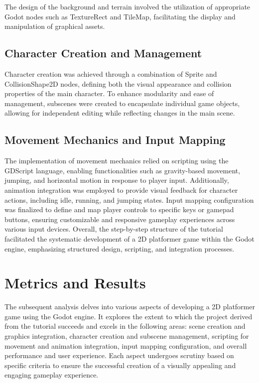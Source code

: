 \documentclass[10pt,twocolumn]{article}
\begin{document}
The design of the background and terrain involved the utilization of appropriate Godot nodes such as TextureRect and TileMap, facilitating the display and manipulation of graphical assets. 

\subsection{Character Creation and Management}
Character creation was achieved through a combination of Sprite and CollisionShape2D nodes, defining both the visual appearance and collision properties of the main character. To enhance modularity and ease of management, subscenes were created to encapsulate individual game objects, allowing for independent editing while reflecting changes in the main scene.

\subsection{Movement Mechanics and Input Mapping}
The implementation of movement mechanics relied on scripting using the GDScript language, enabling functionalities such as gravity-based movement, jumping, and horizontal motion in response to player input. Additionally, animation integration was employed to provide visual feedback for character actions, including idle, running, and jumping states. Input mapping configuration was finalized to define and map player controls to specific keys or gamepad buttons, ensuring customizable and responsive gameplay experiences across various input devices. Overall, the step-by-step structure of the tutorial facilitated the systematic development of a 2D platformer game within the Godot engine, emphasizing structured design, scripting, and integration processes.


\section{Metrics and Results}
The subsequent analysis delves into various aspects of developing a 2D platformer game using the Godot engine. It explores the extent to which the project derived from the tutorial succeeds and excels in the following areas: scene creation and graphics integration, character creation and subscene management, scripting for movement and animation integration, input mapping configuration, and overall performance and user experience. Each aspect undergoes scrutiny based on specific criteria to ensure the successful creation of a visually appealing and engaging gameplay experience.
\end{document}
